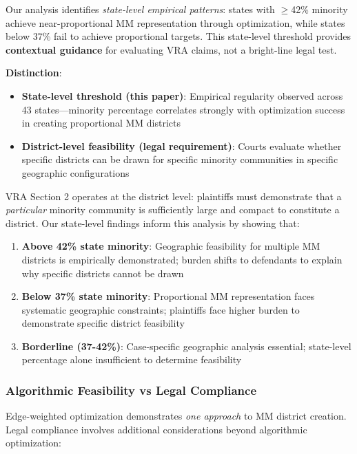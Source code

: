 Our analysis identifies \emph{state-level empirical patterns}: states with $\geq$42\% minority achieve near-proportional MM representation through optimization, while states below 37\% fail to achieve proportional targets. This state-level threshold provides \textbf{contextual guidance} for evaluating VRA claims, not a bright-line legal test.

\textbf{Distinction}:
\begin{itemize}
    \item \textbf{State-level threshold (this paper)}: Empirical regularity observed across 43 states---minority percentage correlates strongly with optimization success in creating proportional MM districts
    \item \textbf{District-level feasibility (legal requirement)}: Courts evaluate whether specific districts can be drawn for specific minority communities in specific geographic configurations
\end{itemize}

VRA Section 2 operates at the district level: plaintiffs must demonstrate that a \emph{particular} minority community is sufficiently large and compact to constitute a district. Our state-level findings inform this analysis by showing that:

\begin{enumerate}
    \item \textbf{Above 42\% state minority}: Geographic feasibility for multiple MM districts is empirically demonstrated; burden shifts to defendants to explain why specific districts cannot be drawn
    \item \textbf{Below 37\% state minority}: Proportional MM representation faces systematic geographic constraints; plaintiffs face higher burden to demonstrate specific district feasibility
    \item \textbf{Borderline (37-42\%)}: Case-specific geographic analysis essential; state-level percentage alone insufficient to determine feasibility
\end{enumerate}

\subsubsection{Algorithmic Feasibility vs Legal Compliance}

Edge-weighted optimization demonstrates \emph{one approach} to MM district creation. Legal compliance involves additional considerations beyond algorithmic optimization:

